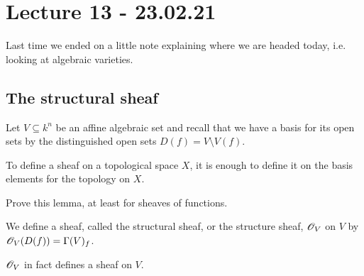 
\section{Lecture 13 - 23.02.21}

Last time we ended on a little note explaining where we are headed today, i.e. looking at algebraic varieties. 


\subsection{The structural sheaf}

Let $V\subseteq k^n$ be an affine algebraic set and recall that we have a basis for its open sets by the distinguished open sets $D(f) = V\setminus V(f)$. 

\begin{lemma}
To define a sheaf on a topological space $X$, it is enough to define it on the basis elements for the topology on $X$. 
\end{lemma}
\begin{problem}
Prove this lemma, at least for sheaves of functions.
\end{problem}

We define a sheaf, called the structural sheaf, or the structure sheaf, $\mathscr{O}_V$ on $V$ by $\mathscr{O}_V(D(f)) = \Gamma(V)_f$. 

\begin{proposition}
$\mathscr{O}_V$ in fact defines a sheaf on $V$.
\end{proposition}


